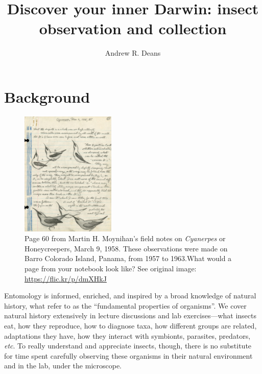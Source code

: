 \documentclass[letterpaper, 11pt]{article}
\title{Discover your inner Darwin: insect observation and collection}
\author{Andrew R. Deans}
\begin{document}
\cleanlookdateon %
\maketitle
\thispagestyle{fancy}

\section*{Background}
\begin{figure}
  \vspace{-24pt}
  \begin{center}
    \includegraphics[width=0.4\textwidth]{Moynihan}%
  \end{center}
  \vspace{-17pt}
  \caption*{Page 60 from Martin H. Moynihan's field notes on \textit{Cyanerpes} or Honeycreepers, March 9, 1958. These observations were made on Barro Colorado Island, Panama, from 1957 to 1963.What would a page from your notebook look like? See original image: \url{https://flic.kr/p/dmXHkJ}}
  \vspace{-30pt}
\end{figure}

Entomology is informed, enriched, and inspired by a broad knowledge of natural history, what \cite{Tewksbury01042014} refer to as the ``fundamental properties of organisms''. We cover natural history extensively in lecture discussions and lab exercises---what insects eat, how they reproduce, how to diagnose taxa, how different groups are related, adaptations they have, how they interact with symbionts, parasites, predators, \textit{etc}. To really understand and appreciate insects, though, there is no substitute for time spent carefully observing these organisms in their natural environment and in the lab, under the microscope. 
\end{document}
